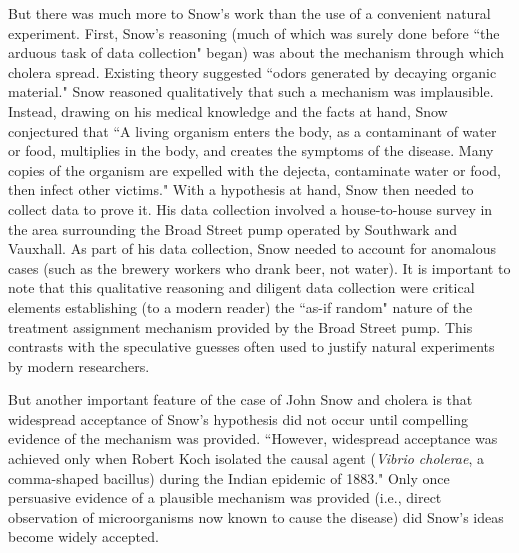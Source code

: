 \documentclass[11pt]{amsart}
\begin{document}
But there was much more to Snow's work than the use of a convenient natural experiment.
First, Snow's reasoning (much of which was surely done before ``the arduous task of data collection" began) was about the  mechanism through which cholera spread. Existing theory suggested ``odors generated by decaying organic material."
Snow reasoned qualitatively that such a mechanism was implausible.
Instead, drawing on his medical knowledge and the facts at hand, Snow conjectured that ``A living organism enters the body, as a contaminant of water or food, multiplies in the body, and creates the symptoms of the disease. Many copies of the organism are expelled with the dejecta, contaminate water or food, then infect other victims."
With a hypothesis at hand, Snow then needed to collect data to prove it.
His data collection involved a house-to-house survey in the area surrounding the Broad Street pump operated by  Southwark and Vauxhall.
As part of his data collection, Snow needed to account for anomalous cases (such as the brewery workers who drank beer, not water).
It is important to note that this qualitative reasoning and diligent data collection were critical elements establishing (to a modern reader) the ``as-if random" nature of the treatment assignment mechanism provided by the Broad Street pump.
This contrasts with the speculative guesses often used to justify natural experiments by modern researchers.

But another important feature of the case of John Snow and cholera is that widespread acceptance of Snow's hypothesis did not occur until compelling evidence of the mechanism was provided.
``However, widespread acceptance was achieved only when Robert Koch isolated the causal agent (\emph{Vibrio cholerae}, a comma-shaped bacillus) during the Indian epidemic of 1883." %
Only once persuasive evidence of a plausible mechanism was provided (i.e., direct observation of microorganisms now known to cause the disease) did Snow's ideas become widely accepted.
\end{document}
